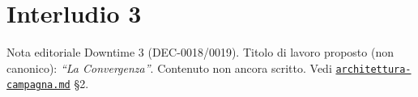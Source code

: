 \chapter*{Interludio 3}
\label{chap:interludio3}

\begin{DndComment}[]{Nota editoriale}
  Downtime 3 (DEC-0018/0019). Titolo di lavoro proposto (non canonico): \textit{``La Convergenza''}. Contenuto non ancora scritto. Vedi \href{https://github.com/fpetrulio/child-of-balance/blob/main/docs/01-campaign-design/architettura-campagna.md}{\texttt{architettura-campagna.md}} §2.
\end{DndComment}
